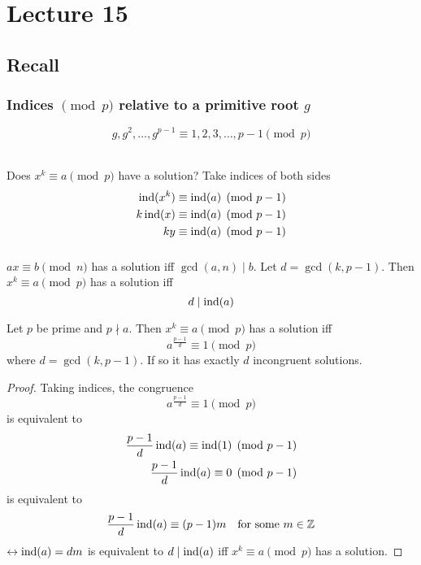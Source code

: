\chapter{Lecture 15}
\date{October 17, 2024}

\section{Recall}
    \subsection{Indices $\pmod{p}$ relative to a primitive root $g$}
    \[
        g,g^2,\dots, g^{p-1}\equiv 1,2,3,\dots,p-1\pmod{p}
    \]\
    \begin{example}
        Does $x^k\equiv a\pmod{p}$ have a solution? Take indices of both sides
        \begin{align*}
            \operatorname{ind}(x^k) &\equiv \operatorname{ind}(a)\pmod{p-1} \\
            k\operatorname{ind}(x) &\equiv \operatorname{ind}(a)\pmod{p-1} \\
            ky &\equiv \operatorname{ind}(a)\pmod{p-1}
        \end{align*}
    \end{example}
    \subsection{}
    $ax\equiv b\pmod{n}$ has a solution iff $\gcd(a,n)\mid b$. 
    Let $d=\gcd(k,p-1)$. Then $x^k\equiv a\pmod{p}$ has a solution iff
    \[ d\mid\operatorname{ind}(a) \]
    \begin{theorem}
        Let $p$ be prime and $p\nmid a$. Then $x^k\equiv a\pmod{p}$ 
        has a solution iff 
        \[ a^{\frac{p-1}{d}}\equiv 1\pmod{p} \] 
        where $d=\gcd(k,p-1)$. 
        If so it has exactly $d$ incongruent solutions.
        \begin{proof}
            Taking indices, the congruence
            \[
                a^{\frac{p-1}{d}}\equiv 1\pmod{p}
            \]
            is equivalent to 
            \begin{align*}
                \frac{p-1}{d}\operatorname{ind}(a)\equiv \operatorname{ind}(1)\pmod{p-1} \\
                \frac{p-1}{d}\operatorname{ind}(a)\equiv 0\pmod{p-1} 
            \end{align*}
            is equivalent to 
            \[
                \frac{p-1}{d}\operatorname{ind}(a)\equiv (p-1)m \quad\text{for some } m\in\mathbb{Z}
            \]
            $\leftrightarrow\operatorname{ind}(a)=dm$ is equivalent to $d\mid\operatorname{ind}(a)$
            iff $x^k\equiv a\pmod{p}$ has a solution.
        \end{proof}
    \end{theorem}

